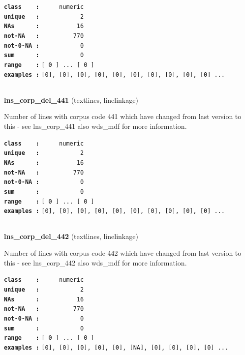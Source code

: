 \documentclass[]{article}
\begin{document}
\textbf{\texttt{class\ \ \ \ :}} \texttt{~~~~~numeric}\\
\textbf{\texttt{unique\ \ \ :}} \texttt{~~~~~~~~~~~2}\\
\textbf{\texttt{NAs\ \ \ \ \ \ :}} \texttt{~~~~~~~~~~16}\\
\textbf{\texttt{not-NA\ \ \ :}} \texttt{~~~~~~~~~770}\\
\textbf{\texttt{not-0-NA\ :}} \texttt{~~~~~~~~~~~0}\\
\textbf{\texttt{sum\ \ \ \ \ \ :}} \texttt{~~~~~~~~~~~0}\\
\textbf{\texttt{range\ \ \ \ :}}
\texttt{{[}\ 0\ {]}\ ...\ {[}\ 0\ {]}}\\
\textbf{\texttt{examples\ :}}
\texttt{{[}0{]},\ {[}0{]},\ {[}0{]},\ {[}0{]},\ {[}0{]},\ {[}0{]},\ {[}0{]},\ {[}0{]},\ {[}0{]},\ {[}0{]}\ ...}\\

~

\textbf{lns\_corp\_del\_441} (textlines, linelinkage)

Number of lines with corpus code 441 which have changed from last
version to this - see lns\_corp\_441 also wds\_mdf for more information.

\textbf{\texttt{class\ \ \ \ :}} \texttt{~~~~~numeric}\\
\textbf{\texttt{unique\ \ \ :}} \texttt{~~~~~~~~~~~2}\\
\textbf{\texttt{NAs\ \ \ \ \ \ :}} \texttt{~~~~~~~~~~16}\\
\textbf{\texttt{not-NA\ \ \ :}} \texttt{~~~~~~~~~770}\\
\textbf{\texttt{not-0-NA\ :}} \texttt{~~~~~~~~~~~0}\\
\textbf{\texttt{sum\ \ \ \ \ \ :}} \texttt{~~~~~~~~~~~0}\\
\textbf{\texttt{range\ \ \ \ :}}
\texttt{{[}\ 0\ {]}\ ...\ {[}\ 0\ {]}}\\
\textbf{\texttt{examples\ :}}
\texttt{{[}0{]},\ {[}0{]},\ {[}0{]},\ {[}0{]},\ {[}0{]},\ {[}0{]},\ {[}0{]},\ {[}0{]},\ {[}0{]},\ {[}0{]}\ ...}\\

~

\textbf{lns\_corp\_del\_442} (textlines, linelinkage)

Number of lines with corpus code 442 which have changed from last
version to this - see lns\_corp\_442 also wds\_mdf for more information.

\textbf{\texttt{class\ \ \ \ :}} \texttt{~~~~~numeric}\\
\textbf{\texttt{unique\ \ \ :}} \texttt{~~~~~~~~~~~2}\\
\textbf{\texttt{NAs\ \ \ \ \ \ :}} \texttt{~~~~~~~~~~16}\\
\textbf{\texttt{not-NA\ \ \ :}} \texttt{~~~~~~~~~770}\\
\textbf{\texttt{not-0-NA\ :}} \texttt{~~~~~~~~~~~0}\\
\textbf{\texttt{sum\ \ \ \ \ \ :}} \texttt{~~~~~~~~~~~0}\\
\textbf{\texttt{range\ \ \ \ :}}
\texttt{{[}\ 0\ {]}\ ...\ {[}\ 0\ {]}}\\
\textbf{\texttt{examples\ :}}
\texttt{{[}0{]},\ {[}0{]},\ {[}0{]},\ {[}0{]},\ {[}0{]},\ {[}NA{]},\ {[}0{]},\ {[}0{]},\ {[}0{]},\ {[}0{]}\ ...}\\
\end{document}
